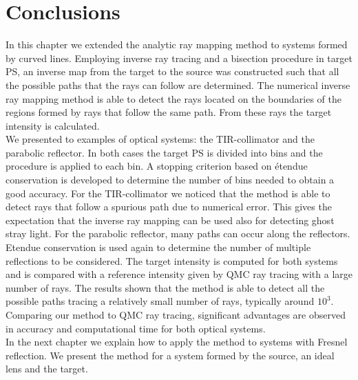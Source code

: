 \section{Conclusions}
In this chapter we extended the analytic ray mapping method to systems formed by curved lines. Employing inverse ray tracing and a bisection procedure in target PS, an inverse map from the target to the source was constructed such that all the possible paths that the rays can follow are determined. The numerical inverse ray mapping method is able to detect the rays located on the boundaries of the regions formed by rays that follow the same path. From these rays the target intensity is calculated. 
\\ \indent
We presented to examples of optical systems: the TIR-collimator and the parabolic reflector. In both cases the target PS is divided into bins and the procedure is applied to each bin. A stopping criterion based on \'{e}tendue conservation is developed to determine the number of bins needed to obtain a good accuracy. For the TIR-collimator we noticed that the method is able to detect rays that follow a spurious path due to numerical error. This gives the expectation that the inverse ray mapping can be used also for detecting ghost stray light.
For the parabolic reflector, many paths can occur along the reflectors. Etendue conservation is used again to determine the number of multiple reflections to be considered. The target intensity is computed for both systems and is compared with a reference intensity given by QMC ray tracing with a large number of rays. The results shown that the method is able to detect all the possible paths tracing a relatively small number of rays, typically around $10^3$. Comparing our method to QMC ray tracing, significant advantages are observed in accuracy and computational time for both optical systems.
\\ \indent In the next chapter we explain how to apply the method to systems with Fresnel reflection. We present the method for a system formed by the source, an ideal lens and the target. 













